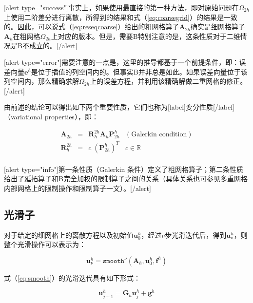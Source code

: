 \documentclass[12pt, UTF8, nofonts]{ctexart}
\begin{document}
[alert type="success"]事实上，如果使用最直接的第一种方法，即对原始问题在$\Omega_{2h}$上使用二阶差分进行离散，所得到的结果和式（\ref{eq:coarsegrid}）的结果是一致的。因此，可以说式（\ref{eq:reseqcoarse}）给出的粗网格算子$\boldsymbol{A}_{2h}$确实是细网格算子$\boldsymbol{A}_{h}$在粗网格$\Omega_{2h}$上对应的版本。但是，需要B特别注意的是，这条性质对于二维情况是B不成立的。[/alert]

[alert type="error"]需要注意的一点是，这里的推导都基于一个前提条件，即：误差向量$\boldsymbol{e}^h$是位于插值的列空间内的。但事实B并非总是如此。如果误差向量位于该列空间内，那么精确求解$\Omega_{2h}$上的误差方程，并利用该精确解做二重网格的修正。[/alert]

由前述的结论可以得出如下两个重要性质，它们也称为[label]变分性质[/label]（variational properties），即：

\[
  \begin{array}{lcll}
    \boldsymbol{A}_{2h} & = & \boldsymbol{R}_{h}^{2h} \boldsymbol{A}_h \boldsymbol{P}_{2h}^{h} & (\textrm{Galerkin condition}) \\
    \boldsymbol{R}_{h}^{2h} & = & c\;\left(\boldsymbol{P}_{2h}^{h}\right)^T & c \in \mathbb{R} \\
  \end{array}
\]

[alert type="info"]第一条性质（Galerkin 条件）定义了粗网格算子；第二条性质给出了延拓算子和B完全加权的限制算子之间的关系（具体关系也可参见多重网格内部网格上的限制操作和限制算子一文）。[/alert]



\subsection*{光滑子}

对于给定的细网格上的离散方程以及初始值$\boldsymbol{u}_{0}^{h}$，经过$\nu$步光滑迭代后，得到$\boldsymbol{u}_{\nu}^h$，则整个光滑操作可以表示为：

\begin{equation}
  \label{eq:smooth}
  \boldsymbol{u}_{\nu}^h = \texttt{smooth}^{\nu}(\boldsymbol{A}_h,\boldsymbol{u}_0^h,\boldsymbol{f}^h)
\end{equation}

式（\ref{eq:smooth}）的光滑迭代具有如下形式：

\begin{equation}
  \label{eq:smoothiter}
  \boldsymbol{u}_{j+1}^h = \boldsymbol{G}_h \boldsymbol{u}_{j}^h + \boldsymbol{g}^h
\end{equation}
\end{document}
